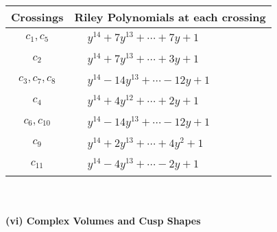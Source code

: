 \documentclass[1p]{elsarticle_modified}
\theoremstyle{definition}
\begin{document}
\begin{tabular}{m{50pt}|m{274pt}}
Crossings & \hspace{64pt}Riley Polynomials at each crossing \\
\hline $$\begin{aligned}c_{1},c_{5}\end{aligned}$$&$\begin{aligned}
&y^{14}+7 y^{13}+\cdots+7 y+1
\end{aligned}$\\
\hline $$\begin{aligned}c_{2}\end{aligned}$$&$\begin{aligned}
&y^{14}+7 y^{13}+\cdots+3 y+1
\end{aligned}$\\
\hline $$\begin{aligned}c_{3},c_{7},c_{8}\end{aligned}$$&$\begin{aligned}
&y^{14}-14 y^{13}+\cdots-12 y+1
\end{aligned}$\\
\hline $$\begin{aligned}c_{4}\end{aligned}$$&$\begin{aligned}
&y^{14}+4 y^{12}+\cdots+2 y+1
\end{aligned}$\\
\hline $$\begin{aligned}c_{6},c_{10}\end{aligned}$$&$\begin{aligned}
&y^{14}-14 y^{13}+\cdots-12 y+1
\end{aligned}$\\
\hline $$\begin{aligned}c_{9}\end{aligned}$$&$\begin{aligned}
&y^{14}+2 y^{13}+\cdots+4 y^2+1
\end{aligned}$\\
\hline $$\begin{aligned}c_{11}\end{aligned}$$&$\begin{aligned}
&y^{14}-4 y^{13}+\cdots-2 y+1
\end{aligned}$\\
\hline
\end{tabular}\\~\\
\newpage\flushleft \textbf{(vi) Complex Volumes and Cusp Shapes}
\end{document}
